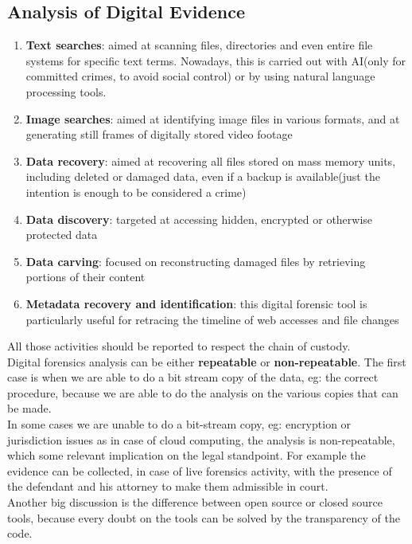 \subsection{Analysis of Digital Evidence}
\begin{enumerate}
  \item \textbf{Text searches}: aimed at scanning files, directories
    and even entire file systems for specific text terms. Nowadays,
    this is carried out with AI(only for committed crimes, to avoid
    social control) or by using natural language processing tools.
  \item \textbf{Image searches}: aimed at identifying image files in
    various formats, and at generating still frames of digitally
    stored video footage
  \item \textbf{Data recovery}: aimed at recovering all files stored
    on mass memory units, including deleted or damaged data, even if
    a backup is available(just the intention is enough to be 
    considered a crime)
  \item \textbf{Data discovery}: targeted at accessing hidden,
    encrypted or otherwise protected data
  \item \textbf{Data carving}: focused on reconstructing damaged files
    by retrieving portions of their content
  \item \textbf{Metadata recovery and identification}: this digital
    forensic tool is particularly useful for retracing the timeline of
    web accesses and file changes
\end{enumerate}
All those activities should be reported to respect the chain of 
custody.\\ 
Digital forensics analysis can be either \textbf{repeatable} or
\textbf{non-repeatable}. The first case is when we are able to do a
bit stream copy of the data, eg: the correct procedure, because we are
able to do the analysis on the various copies that can be made.\\
In some cases we are unable to do a bit-stream copy, eg: encryption or
jurisdiction issues as in case of cloud computing, the analysis is 
non-repeatable, which some relevant implication on the legal
standpoint. For example the evidence can be collected, in case of live
forensics activity, with the presence of the defendant and his
attorney to make them admissible in court.\\
Another big discussion is the difference between open source or closed
source tools, because every doubt on the tools can be solved by the
transparency of the code.\\
